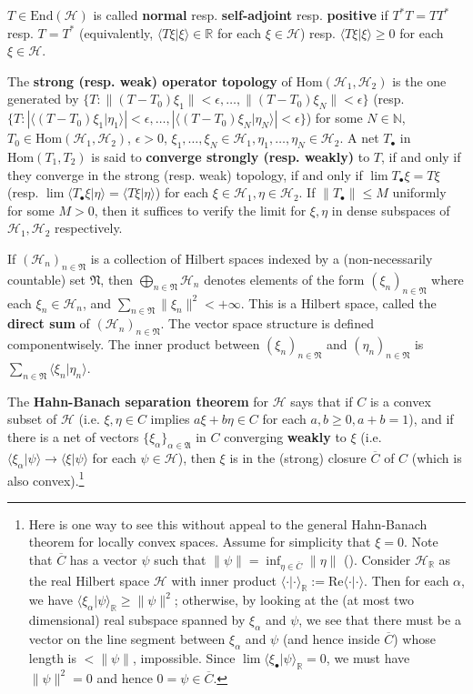\documentclass[12pt,a4paper,notitlepage]{article}
\theoremstyle{definition}
\theoremstyle{plain}
\newcommand{\fk}{\mathfrak}
\newcommand{\mc}{\mathcal}
\newcommand{\ovl}{\overline}
\newcommand{\End}{\mathrm{End}} %
\newcommand{\Hom}{\mathrm{Hom}}
\newcommand{\bk}[1]{\langle {#1}\rangle}
\newcommand{\blt}{\bullet}
\newcommand{\Nbb}{\mathbb N}
\newcommand{\Rbb}{\mathbb R}
\numberwithin{equation}{section}
\begin{document}
$T\in\End(\mc H)$ is called \textbf{normal} resp. \textbf{self-adjoint} resp. \textbf{positive}  if $T^*T=TT^*$ resp. $T=T^*$ (equivalently, $\bk{T\xi|\xi}\in\Rbb$ for each $\xi\in\mc H$) resp. $\bk{T\xi|\xi}\geq 0$ for each $\xi\in\mc H$.

The \textbf{strong (resp. weak) operator topology} of $\Hom(\mc H_1,\mc H_2)$ is the one generated by $\{T:\lVert (T-T_0)\xi_1\lVert<\epsilon,\dots,\lVert (T-T_0)\xi_N\lVert<\epsilon\}$ (resp. $\{T:|\bk{(T-T_0)\xi_1|\eta_1}|<\epsilon,\dots,|\bk{(T-T_0)\xi_N|\eta_N}|<\epsilon\}$) for some $N\in\Nbb$, $T_0\in\Hom(\mc H_1,\mc H_2)$,  $\epsilon>0$, $\xi_1,\dots,\xi_N\in\mc H_1,\eta_1,\dots,\eta_N\in\mc H_2$. A net $T_\blt$ in $\Hom(T_1,T_2)$ is said to \textbf{converge strongly (resp. weakly)} to $T$, if and only if they converge in the strong (resp. weak) topology, if and only if $\lim T_\blt\xi=T\xi$ (resp. $\lim\bk{T_\blt\xi|\eta}=\bk{T\xi|\eta}$) for each $\xi\in\mc H_1,\eta\in\mc H_2$. If $\lVert T_\blt\lVert\leq M$ uniformly for some $M>0$, then it suffices to verify the limit for $\xi,\eta$ in dense subspaces of $\mc H_1,\mc H_2$ respectively.

If $(\mc H_n)_{n\in\fk N}$ is a collection of Hilbert spaces indexed by a (non-necessarily countable) set $\fk N$, then  $\bigoplus_{n\in\fk N}\mc H_n$ denotes elements of the form $(\xi_n)_{n\in\fk N}$ where each $\xi_n\in\mc H_n$, and $\sum_{n\in\fk N}\lVert\xi_n\lVert^2<+\infty$. This is a Hilbert space, called the \textbf{direct sum} of $(\mc H_n)_{n\in\fk N}$. The vector space structure is defined componentwisely. The inner product between $(\xi_n)_{n\in\fk N}$ and $(\eta_n)_{n\in\fk N}$ is $\sum_{n\in\fk N}\bk{\xi_n|\eta_n}$.

The \textbf{Hahn-Banach separation theorem} for $\mc H$ says that if $C$ is a convex subset of $\mc H$ (i.e. $\xi,\eta\in C$ implies $a\xi+b\eta\in C$ for each $a,b\geq 0,a+b=1$), and if there is a net of vectors $\{\xi_\alpha\}_{\alpha\in\fk A}$ in $C$ converging \textbf{weakly} to $\xi$ (i.e. $\bk{\xi_\alpha|\psi}\rightarrow\bk{\xi|\psi}$ for each $\psi\in\mc H$), then $\xi$ is in the (strong) closure $\ovl C$ of $C$ (which is also convex).\footnote{Here is one way to see this without appeal to the general Hahn-Banach theorem for locally convex spaces. Assume for simplicity that $\xi=0$. Note that $\ovl C$ has a vector $\psi$ such that $\lVert\psi\lVert=\inf_{\eta\in \ovl C}\lVert \eta\lVert$ (\cite[Thm. 4.10]{Rud-R}). Consider $\mc H_\Rbb$ as the real Hilbert space $\mc H$ with inner product $\bk{\cdot|\cdot}_\Rbb:=\mathrm{Re}\bk{\cdot|\cdot}$.  Then for each $\alpha$, we have $\bk{\xi_\alpha|\psi}_\Rbb\geq\lVert \psi\lVert^2$; otherwise, by looking at the (at most two dimensional) real subspace spanned by $\xi_\alpha$ and $\psi$, we see that there must be a vector on the line segment between $\xi_\alpha$ and $\psi$ (and hence inside $\ovl C$) whose length is $<\lVert\psi\lVert$, impossible. Since $\lim\bk{\xi_\blt|\psi}_\Rbb=0$, we must have $\lVert \psi\lVert^2=0$ and hence $0=\psi\in\ovl C$.}
\end{document}
